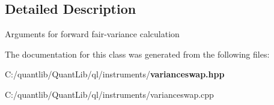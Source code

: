 \subsection{Detailed Description}
Arguments for forward fair-\/variance calculation 

The documentation for this class was generated from the following files\+:\begin{DoxyCompactItemize}
\item 
C\+:/quantlib/\+Quant\+Lib/ql/instruments/{\bf varianceswap.\+hpp}\item 
C\+:/quantlib/\+Quant\+Lib/ql/instruments/varianceswap.\+cpp\end{DoxyCompactItemize}
